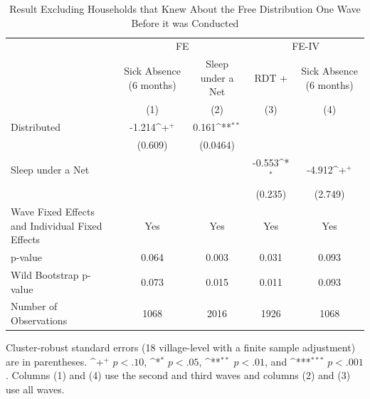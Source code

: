 \documentclass[fleqn,11pt]{article}
\newcommand{\sym}[1]{\rlap{$#1$}}
\def\sym#1{\ifmmode^{#1}\else\(^{#1}\)\fi
}
\begin{document}
\begin{table}[h]
\caption{Result Excluding Households that Knew About the Free Distribution One Wave Before it was Conducted}
\label{distributionknow}
\centering
\centering
\begin{adjustbox}{max width=\textwidth}
\begin{threeparttable}
\begin{tabular}{l*{4}{c}}
\hline\hline                                        &\multicolumn{2}{c}{FE}&\multicolumn{2}{c}{FE-IV}\\ \cmidrule(lr){2-3}\cmidrule(lr){4-5}

                    &\multicolumn{1}{c}{Sick Absence (6 months)}&\multicolumn{1}{c}{Sleep under a Net}&\multicolumn{1}{c}{RDT +}&\multicolumn{1}{c}{Sick Absence (6 months)}\\
                                                            &\multicolumn{1}{c}{(1)}&\multicolumn{1}{c}{(2)}&\multicolumn{1}{c}{(3)}&\multicolumn{1}{c}{(4)}\\
\hline
Distributed         &      -1.214\sym{+}  &       0.161\sym{**} &                     &                     \\
                    &     (0.609)         &    (0.0464)         &                     &                     \\
Sleep under a Net      &                     &                     &      -0.553\sym{*}  &      -4.912\sym{+}  \\
                    &                     &                     &     (0.235)         &     (2.749)         \\
\hline
Wave Fixed Effects and Individual Fixed Effects & Yes & Yes & Yes& Yes \\
 p-value   &       0.064         &       0.003      &       0.031         &       0.093         \\
  Wild Bootstrap p-value &       0.073         &       0.015         &       0.011         &       0.093         \\
Number of Observations        &        1068         &        2016         &        1926         &        1068         \\
\hline\hline
\end{tabular}
\begin{tablenotes}
\item Cluster-robust standard errors (18 village-level with a finite sample adjustment) are in parentheses. \sym{+} \(p<.10\), \sym{*} \(p<.05\), \sym{**} \(p<.01\), and \sym{***} \(p<.001\). Columns (1) and (4) use the second and third waves and columns (2) and (3) use all waves.

\end{tablenotes}

\end{threeparttable}
\end{adjustbox}
\end{table}
\end{document}
